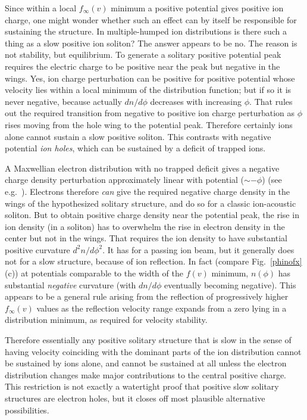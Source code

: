 \documentclass[pre]{revtex4-2}
\begin{document}
Since within a local $f_\infty(v)$ minimum a positive potential gives
positive ion charge, one might wonder whether such an effect can by
itself be responsible for sustaining the structure. In multiple-humped
ion distributions is there such a thing as a slow positive ion
soliton?  The answer appears to be no. The reason is not stability,
but equilibrium. To generate a solitary positive potential peak
requires the electric charge to be positive near the peak but negative
in the wings. Yes, ion charge perturbation can be positive for
positive potential whose velocity lies within a local minimum of the
distribution function; but if so it is never negative, because
actually $dn/d\phi$ decreases with increasing $\phi$. That rules out
the required transition from negative to positive ion charge
perturbation as $\phi$ rises moving from the hole wing to the
potential peak. Therefore certainly ions alone cannot sustain a slow
positive soliton. This contrasts with negative potential \emph{ion
  holes}, which can be sustained by a deficit of trapped ions.

A Maxwellian electron distribution with no trapped deficit gives a
negative charge density perturbation approximately linear with
potential ($\sim -\phi$) (see e.g.\ \cite{Hutchinson2017}).  Electrons
therefore \emph{can} give the required negative charge density in the
wings of the hypothesized solitary structure, and do so for a classic
ion-acoustic soliton. But to obtain positive charge density near the
potential peak, the rise in ion density (in a soliton) has to
overwhelm the rise in electron density in the center but not in the
wings. That requires the ion density to have substantial positive
curvature $d^2n/d\phi^2$. It has for a passing ion beam, but it
generally does not for a slow structure, because of ion reflection. In
fact (compare Fig.\ \ref{phinofx}(c)) at potentials comparable to the
width of the $f(v)$ minimum, $n(\phi)$ has substantial \emph{negative}
curvature (with $dn/d\phi$ eventually becoming negative). This
appears to be a general rule arising from the reflection of
progressively higher $f_\infty(v)$ values as the reflection velocity range
expands from a zero lying in a distribution minimum, as required for
velocity stability.

Therefore essentially any positive solitary structure that is slow in
the sense of having velocity coinciding with the dominant parts of the
ion distribution cannot be sustained by ions alone, and cannot be
sustained at all unless the electron distribution changes make major
contributions to the central positive charge. This restriction is not
exactly a watertight proof that positive slow solitary structures are
electron holes, but it closes off most plausible alternative possibilities.
\end{document}
